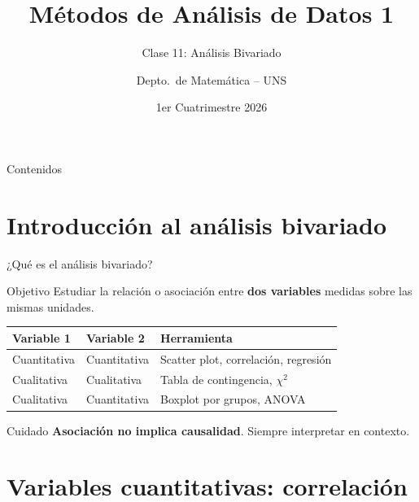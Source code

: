 \documentclass[aspectratio=169]{beamer}
\title{Métodos de Análisis de Datos 1}
\subtitle{Clase 11: Análisis Bivariado}
\author{Depto.\ de Matemática -- UNS}
\institute{Universidad Nacional del Sur}
\date{1er Cuatrimestre 2026}
\begin{document}
\begin{frame}
  \titlepage
\end{frame}

\begin{frame}{Contenidos}
  \tableofcontents
\end{frame}

\section{Introducción al análisis bivariado}

\begin{frame}{¿Qué es el análisis bivariado?}
  \begin{block}{Objetivo}
    Estudiar la relación o asociación entre \textbf{dos variables} medidas sobre las mismas unidades.
  \end{block}
  \bigskip
  \begin{center}
    \begin{tabular}{lll}
      \toprule
      \textbf{Variable 1} & \textbf{Variable 2} & \textbf{Herramienta} \\
      \midrule
      Cuantitativa & Cuantitativa & Scatter plot, correlación, regresión \\
      Cualitativa & Cualitativa & Tabla de contingencia, $\chi^2$ \\
      Cualitativa & Cuantitativa & Boxplot por grupos, ANOVA \\
      \bottomrule
    \end{tabular}
  \end{center}
  \bigskip
  \begin{alertblock}{Cuidado}
    \textbf{Asociación no implica causalidad}. Siempre interpretar en contexto.
  \end{alertblock}
\end{frame}

\section{Variables cuantitativas: correlación}
\end{document}
